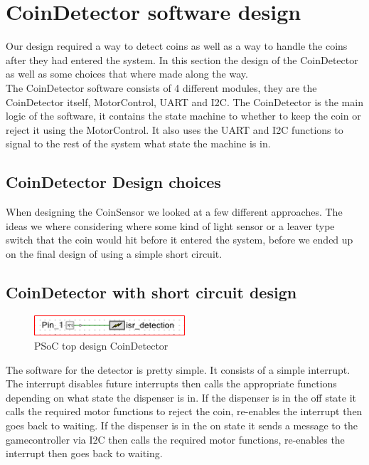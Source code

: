 \documentclass[Softwaredesign/Softwaredesign_main.tex]{subfiles}
\begin{document}
    \section{CoinDetector software design}\label{sec:coindetectorSoftwareDesign}
    Our design required a way to detect coins as well as a way to handle the coins after they had entered the system.
    In this section the design of the CoinDetector as well as some choices that where made along the way.\\
    The CoinDetector software consists of 4 different modules, they are the CoinDetector itself, MotorControl, UART and I2C.
    The CoinDetector is the main logic of the software, it contains the state machine to whether to keep the coin or reject it using the MotorControl.
    It also uses the UART and I2C functions to signal to the rest of the system what state the machine is in.


    \subsection{CoinDetector Design choices}\label{subsec:coindetectorDesignChoices}
    When designing the CoinSensor we looked at a few different approaches.
    The ideas we where considering where some kind of light sensor or a leaver type switch that the coin
    would hit before it entered the system, before we ended up on the final design of using a simple short circuit.


    \subsection{CoinDetector with short circuit design}\label{subsec:coindetectorWithShortCircuitDesign}
    \begin{figure}[H]
    \centering
    \includegraphics[width=0.5\textwidth]{Softwaredesign/CoinSensor/graphics/TopDesign-CoinDetector.png}
    \caption{PSoC top design CoinDetector}
    \label{fig:CoinDetector_PSoC_Design}
    \end{figure}
    The software for the detector is pretty simple.
    It consists of a simple interrupt.
    The interrupt disables future interrupts then calls the appropriate functions depending on what state the dispenser is in.
    If the dispenser is in the off state it calls the required motor functions to reject the coin,
    re-enables the interrupt then goes back to waiting.
    If the dispenser is in the on state it sends a message to the gamecontroller via I2C then calls the required motor functions,
    re-enables the interrupt then goes back to waiting.
\end{document}

